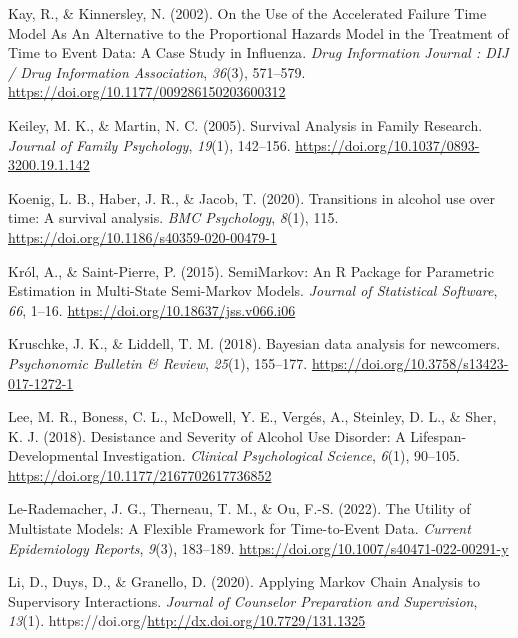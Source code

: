 \documentclass[12pt]{./styles/outhesis}
\begin{document}
\leavevmode{}%
Kay, R., \& Kinnersley, N. (2002). On the {Use} of the {Accelerated
Failure Time Model As An Alternative} to the {Proportional Hazards
Model} in the {Treatment} of {Time} to {Event Data}: {A Case Study} in
{Influenza}. \emph{Drug Information Journal : DIJ / Drug Information
Association}, \emph{36}(3), 571--579.
\url{https://doi.org/10.1177/009286150203600312}

\leavevmode{}%
Keiley, M. K., \& Martin, N. C. (2005). Survival {Analysis} in {Family
Research}. \emph{Journal of Family Psychology}, \emph{19}(1), 142--156.
\url{https://doi.org/10.1037/0893-3200.19.1.142}

\leavevmode{}%
Koenig, L. B., Haber, J. R., \& Jacob, T. (2020). Transitions in alcohol
use over time: A survival analysis. \emph{BMC Psychology}, \emph{8}(1),
115. \url{https://doi.org/10.1186/s40359-020-00479-1}

\leavevmode{}%
Król, A., \& Saint-Pierre, P. (2015). {SemiMarkov}: {An R Package} for
{Parametric Estimation} in {Multi-State Semi-Markov Models}.
\emph{Journal of Statistical Software}, \emph{66}, 1--16.
\url{https://doi.org/10.18637/jss.v066.i06}

\leavevmode{}%
Kruschke, J. K., \& Liddell, T. M. (2018). Bayesian data analysis for
newcomers. \emph{Psychonomic Bulletin \& Review}, \emph{25}(1),
155--177. \url{https://doi.org/10.3758/s13423-017-1272-1}

\leavevmode{}%
Lee, M. R., Boness, C. L., McDowell, Y. E., Vergés, A., Steinley, D. L.,
\& Sher, K. J. (2018). Desistance and {Severity} of {Alcohol Use
Disorder}: {A Lifespan-Developmental Investigation}. \emph{Clinical
Psychological Science}, \emph{6}(1), 90--105.
\url{https://doi.org/10.1177/2167702617736852}

\leavevmode{}%
Le-Rademacher, J. G., Therneau, T. M., \& Ou, F.-S. (2022). The
{Utility} of {Multistate Models}: {A Flexible Framework} for
{Time-to-Event Data}. \emph{Current Epidemiology Reports}, \emph{9}(3),
183--189. \url{https://doi.org/10.1007/s40471-022-00291-y}

\leavevmode{}%
Li, D., Duys, D., \& Granello, D. (2020). Applying {Markov Chain
Analysis} to {Supervisory Interactions}. \emph{Journal of Counselor
Preparation and Supervision}, \emph{13}(1).
https://doi.org/\url{http://dx.doi.org/10.7729/131.1325}
\end{document}
